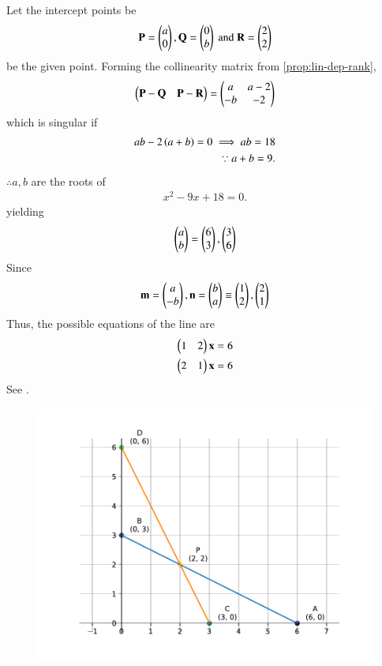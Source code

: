 Let  the intercept points be
\begin{align}
{\mathbf{P}}=\begin{pmatrix}
  a\\
  0\end{pmatrix}
 , {\mathbf{Q}}=\begin{pmatrix}
  0\\
  b\end{pmatrix}
  \text{ and }
   {\mathbf{R}}=\begin{pmatrix}
  2\\
  2\end{pmatrix}
\end{align}
be the given point.  
Forming the collinearity matrix from 
		\eqref{prop:lin-dep-rank},
\begin{align}
	\begin{pmatrix} \mathbf{P}-\mathbf{Q} &\mathbf{P}-\mathbf{R}\end{pmatrix} 
	=
	 \begin{pmatrix}
  a & a-2\\
  -b & -2
 \end{pmatrix}
\end{align}
which is singular if 
\begin{align}
 ab -2\left(a+b\right) = 0
 \implies ab = 18
		\label{eq:11/10/2/13-a+b}
		\\
\because  a + b = 9.
\end{align}
$\therefore a,b$
are the roots of
\begin{align}
	x^2 -9x +18 = 0.
\end{align}
yielding
\begin{align}
	\begin{pmatrix}a \\ b\end{pmatrix} = \begin{pmatrix}6 \\ 3\end{pmatrix}, \begin{pmatrix}3\\6\end{pmatrix}
\end{align}
Since 
\begin{align}
	\mathbf{m} = \begin{pmatrix}a \\ -b\end{pmatrix},
	\mathbf{n} = \begin{pmatrix}b \\ a\end{pmatrix} \equiv \begin{pmatrix}1 \\ 2\end{pmatrix}, \begin{pmatrix}2\\1\end{pmatrix}
\end{align}
Thus, the possible equations of the line are 
\begin{align}
\begin{pmatrix}1 & 2\end{pmatrix}\mathbf{x} = 6
	\\
	\begin{pmatrix}2&1\end{pmatrix}\mathbf{x} = 6
\end{align}
		See .
	\begin{figure}[H]
		\centering
 \includegraphics[width=0.75\columnwidth]{chapters/11/10/2/13/figs/fig.pdf}
		\caption{}
		\label{fig:11/10/2/13}
  	\end{figure}
